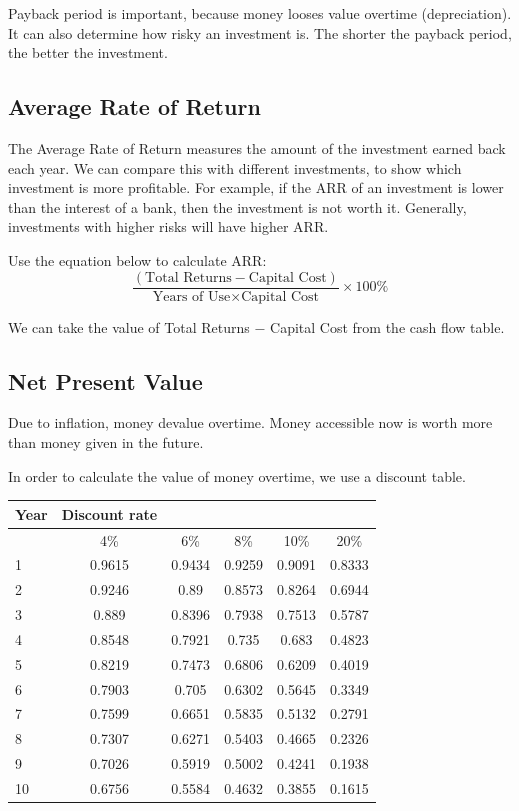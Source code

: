 \documentclass{standalone}
\begin{document}
Payback period is important, because money looses value overtime (depreciation).
It can also determine how risky an investment is.
The shorter the payback period, the better the investment.

\subsection{Average Rate of Return}
The Average Rate of Return measures the amount of the investment earned back each year.
We can compare this with different investments, to show which investment is more profitable.
For example, if the ARR of an investment is lower than the interest of a bank, then the investment is not worth it.
Generally, investments with higher risks will have higher ARR.

Use the equation below to calculate ARR:
\begin{equation}
    \frac{(\textrm{Total Returns} - \textrm{Capital Cost})}{\textrm{Years of Use} \times \textrm{Capital Cost}} \times 100 \%
\end{equation}

We can take the value of Total Returns $-$ Capital Cost from the cash flow table.

\subsection{Net Present Value}
Due to inflation, money devalue overtime.
Money accessible now is worth more than money given in the future.

In order to calculate the value of money overtime, we use a discount table.

\begin{tabular}{l c c c c c}
    Year   & Discount rate &        &        &        & \\
    \hline
           & 4\%           & 6\%    & 8\%    & 10\%   & 20\% \\
    \hline
    \hline
    1      & 0.9615        & 0.9434 & 0.9259 & 0.9091 & 0.8333 \\
    2      & 0.9246        & 0.89   & 0.8573 & 0.8264 & 0.6944 \\
    3      & 0.889         & 0.8396 & 0.7938 & 0.7513 & 0.5787 \\
    4      & 0.8548        & 0.7921 & 0.735  & 0.683  & 0.4823 \\
    5      & 0.8219        & 0.7473 & 0.6806 & 0.6209 & 0.4019 \\
    6      & 0.7903        & 0.705  & 0.6302 & 0.5645 & 0.3349 \\
    7      & 0.7599        & 0.6651 & 0.5835 & 0.5132 & 0.2791 \\
    8      & 0.7307        & 0.6271 & 0.5403 & 0.4665 & 0.2326 \\
    9      & 0.7026        & 0.5919 & 0.5002 & 0.4241 & 0.1938 \\
    10     & 0.6756        & 0.5584 & 0.4632 & 0.3855 & 0.1615
\end{tabular}
\end{document}
